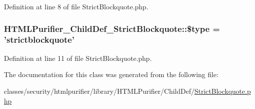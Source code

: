 Definition at line 8 of file Strict\+Blockquote.\+php.

\hypertarget{classHTMLPurifier__ChildDef__StrictBlockquote_ac98c7b6e19426f0366c651034edee22f}{
\subsubsection[{\$type}]{\setlength{\rightskip}{0pt plus 5cm}H\+T\+M\+L\+Purifier\+\_\+\+Child\+Def\+\_\+\+Strict\+Blockquote\+::\$type = 'strictblockquote'}}\label{classHTMLPurifier__ChildDef__StrictBlockquote_ac98c7b6e19426f0366c651034edee22f}


Definition at line 11 of file Strict\+Blockquote.\+php.



The documentation for this class was generated from the following file\+:\begin{DoxyCompactItemize}
\item 
classes/security/htmlpurifier/library/\+H\+T\+M\+L\+Purifier/\+Child\+Def/\hyperlink{StrictBlockquote_8php}{Strict\+Blockquote.\+php}\end{DoxyCompactItemize}
